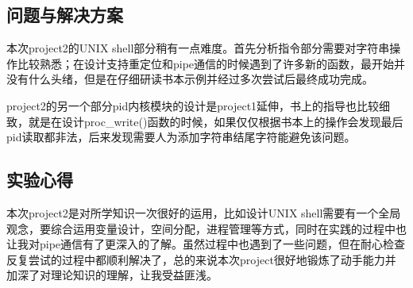 \documentclass{article}
\begin{document}
\subsection{问题与解决方案}
本次project2的UNIX shell部分稍有一点难度。首先分析指令部分需要对字符串操作比较熟悉；在设计支持重定位和pipe通信的时候遇到了许多新的函数，最开始并没有什么头绪，但是在仔细研读书本示例并经过多次尝试后最终成功完成。

project2的另一个部分pid内核模块的设计是project1延伸，书上的指导也比较细致，就是在设计proc\_write()函数的时候，如果仅仅根据书本上的操作会发现最后pid读取都非法，后来发现需要人为添加字符串结尾字符能避免该问题。

\subsection{实验心得}
本次project2是对所学知识一次很好的运用，比如设计UNIX shell需要有一个全局观念，要综合运用变量设计，空间分配，进程管理等方式，同时在实践的过程中也让我对pipe通信有了更深入的了解。虽然过程中也遇到了一些问题，但在耐心检查反复尝试的过程中都顺利解决了，总的来说本次project很好地锻炼了动手能力并加深了对理论知识的理解，让我受益匪浅。




\end{document}
